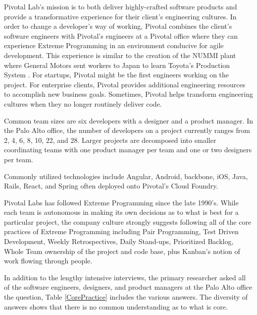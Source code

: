 Pivotal Lab's mission is to both deliver highly-crafted software products and provide a transformative experience for their client's engineering cultures. In order to change a developer's way of working, Pivotal combines the client's software engineers with Pivotal's engineers at a Pivotal office where they can experience Extreme Programming in an environment conducive for agile development. This experience is similar to the creation of the NUMMI plant where General Motors sent workers to Japan to learn Toyota's Production System \cite{Nummi}. For startups, Pivotal might be the first engineers working on the project. For enterprise clients, Pivotal provides additional engineering resources to accomplish new business goals. Sometimes, Pivotal helps transform engineering cultures when they no longer routinely deliver code.  

Common team sizes are six developers with a designer and a product manager. In the Palo Alto office, the number of developers on a project currently ranges from 2, 4, 6, 8, 10, 22, and 28. Larger projects are decomposed into smaller coordinating teams with one product manager per team and one or two designers per team. 

Commonly utilized technologies include Angular, Android, backbone, iOS, Java, Rails, React, and Spring often deployed onto Pivotal's Cloud Foundry. 

Pivotal Labs has followed Extreme Programming \cite{ExtremeProgramming2004} since the late 1990's. While each team is autonomous in making its own decisions as to what is best for a particular project, the company culture strongly suggests following all of the core practices of Extreme Programming including Pair Programming, Test Driven Development, Weekly Retrospectives, Daily Stand-ups, Prioritized Backlog, Whole Team ownership of the project and code base, plus Kanban's notion of work flowing through people.

In addition to the lengthy intensive interviews, the primary researcher asked all of the software engineers, designers, and product managers at the Palo Alto office the question,  Table \ref{CorePractice} includes the various answers. The diversity of answers shows that there is no common understanding as to what is core. 

